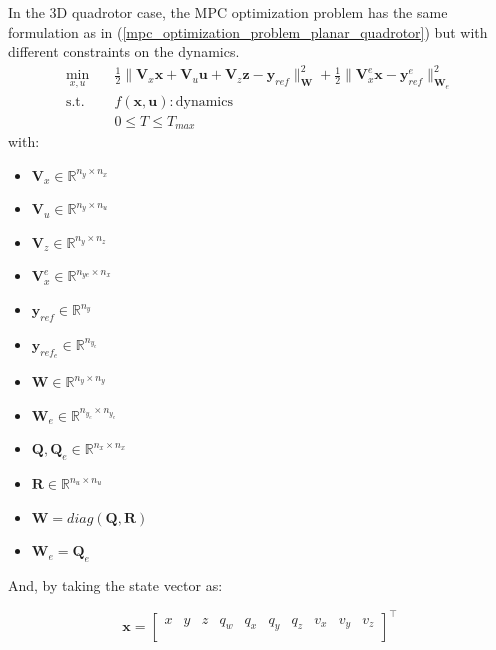 \documentclass{thesisreport}
\begin{document}
In the 3D quadrotor case, the MPC optimization problem has the same formulation as in (\ref{mpc_optimization_problem_planar_quadrotor})
but with different constraints on the dynamics.
	\begin{equation}\label{mpc_optimization_problem_3d_quadrotor}
\begin{aligned}
            \min_{x,u} \quad & \frac{1}{2}\|\bm{V}_x \bm{x} + \bm{V}_u \bm{u} + \bm{V}_z \bm{z} - \bm{y}_{ref}\|^2_{\bm{W}} + \frac{1}{2}\|\bm{V}_x^e \bm{x} - \bm{y}_{ref}^e \|^2_{\bm{W}_e} \\
            \textrm{s.t.} \quad & f(\bm{x},\bm{u}):\text{dynamics} \\
            & 0 \leq T \leq T_{max}
        \end{aligned}
\end{equation}
with: 
\begin{multicols}{3}
\begin{itemize}
	\item $\bm{V}_x \in \mathbb{R}^{n_y \times n_x}$
	\item $\bm{V}_u \in \mathbb{R}^{n_y \times n_u}$ 
	\item $\bm{V}_z \in \mathbb{R}^{n_y \times n_z}$
	\item $\bm{V}_x^e \in \mathbb{R}^{n_{ye}\times n_x}$
\end{itemize}
\columnbreak
\begin{itemize}
	\item $\bm{y}_{ref} \in \mathbb{R}^{n_y}$
	\item $\bm{y}_{ref_e} \in \mathbb{R}^{n_{y_e}}$
	\item $\bm{W} \in \mathbb{R}^{n_y \times n_y}$
	\item $\bm{W}_e \in \mathbb{R}^{n_{y_e} \times n_{y_e}}$
\end{itemize}
\columnbreak
\begin{itemize}
	\item $\bm{Q},\bm{Q}_e \in \mathbb{R}^{n_x \times n_x}$
	\item $\bm{R} \in \mathbb{R}^{n_u \times n_u}$
	\item $\bm{W} = diag(\bm{Q},\bm{R}) $
	\item $\bm{W}_e = \bm{Q}_e $
\end{itemize}
\end{multicols}

And, by taking the state vector as:

\begin{equation}
	\bm{x} = \begin{bmatrix}
		x & y & z & q_w & q_x & q_y & q_z & v_x & v_y & v_z\\
	\end{bmatrix}^{\intercal}
\end{equation}
\end{document}
